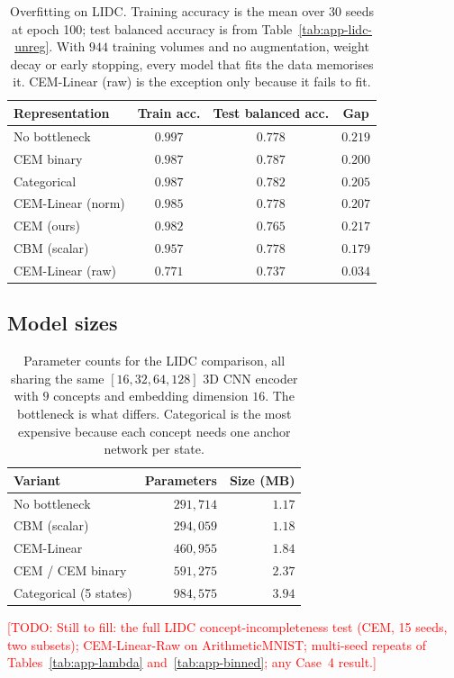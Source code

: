 \documentclass[11pt]{article}
\newcommand{\todo}[1]{\textcolor{red}{[TODO: #1]}}
\begin{document}
\begin{table}[h]
\centering
\caption{Overfitting on LIDC. Training accuracy is the mean over 30 seeds at
epoch 100; test balanced accuracy is from Table~\ref{tab:app-lidc-unreg}. With
$944$ training volumes and no augmentation, weight decay or early stopping,
every model that fits the data memorises it. CEM-Linear (raw) is the exception
only because it fails to fit.}
\label{tab:app-overfit-unreg}
\begin{tabular}{lccc}
\toprule
\textbf{Representation} & \textbf{Train acc.} & \textbf{Test balanced acc.} &
\textbf{Gap} \\
\midrule
No bottleneck     & $0.997$ & $0.778$ & $0.219$ \\
CEM binary        & $0.987$ & $0.787$ & $0.200$ \\
Categorical       & $0.987$ & $0.782$ & $0.205$ \\
CEM-Linear (norm) & $0.985$ & $0.778$ & $0.207$ \\
CEM (ours)        & $0.982$ & $0.765$ & $0.217$ \\
CBM (scalar)      & $0.957$ & $0.778$ & $0.179$ \\
CEM-Linear (raw)  & $0.771$ & $0.737$ & $0.034$ \\
\bottomrule
\end{tabular}
\end{table}

\subsection{Model sizes}

\begin{table}[h]
\centering
\caption{Parameter counts for the LIDC comparison, all sharing the same
$[16,32,64,128]$ 3D CNN encoder with $9$ concepts and embedding dimension $16$.
The bottleneck is what differs. Categorical is the most expensive because each
concept needs one anchor network per state.}
\label{tab:app-sizes}
\begin{tabular}{lrr}
\toprule
\textbf{Variant} & \textbf{Parameters} & \textbf{Size (MB)} \\
\midrule
No bottleneck            & $291{,}714$ & $1.17$ \\
CBM (scalar)             & $294{,}059$ & $1.18$ \\
CEM-Linear               & $460{,}955$ & $1.84$ \\
CEM / CEM binary         & $591{,}275$ & $2.37$ \\
Categorical (5 states)   & $984{,}575$ & $3.94$ \\
\bottomrule
\end{tabular}
\end{table}

\todo{Still to fill: the full LIDC concept-incompleteness test (CEM, 15
seeds, two subsets); CEM-Linear-Raw on ArithmeticMNIST; multi-seed repeats of
Tables~\ref{tab:app-lambda} and~\ref{tab:app-binned}; any Case~4 result.}



\end{document}
